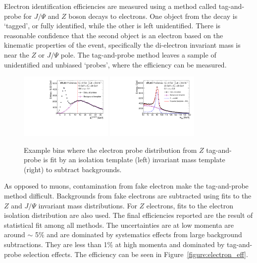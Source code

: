 Electron identification efficiencies are measured using a method called tag-and-probe for $J/\Psi$ and $Z$ boson decays to electrons. One object from the decay is `tagged', or fully identified, while the other is left unidentified. There is reasonable confidence that the second object is an electron based on the kinematic properties of the event, specifically the di-electron invariant mass is near the $Z$ or $J/\Psi$ pole. The tag-and-probe method leaves a sample of unidentified and unbiased `probes', where the efficiency can be measured.

\begin{figure}[!t]
\centering 
\includegraphics[width=0.40\textwidth]{figs/electron/fig_06a}
\includegraphics[width=0.40\textwidth]{figs/electron/fig_04a}
\caption{Example bins where the electron probe distribution from $Z$ tag-and-probe is fit by an isolation template (left) invariant mass template (right) to subtract backgrounds.} 
\label{figure:electron_probe}
\end{figure}


As opposed to muons, contamination from fake electron make the tag-and-probe method difficult. Backgrounds from fake electrons are subtracted using fits to the $Z$ and $J/\Psi$ invariant mass distributions. For $Z$ electrons, fits to the electron isolation distribution are also used. The final efficiencies reported are the result of statistical fit among all methods. The uncertainties are at low momenta are around $\sim$ 5\% and are dominated by systematics effects from large background subtractions. They are less than 1\% at high momenta and dominated by tag-and-probe selection effects. The efficiency can be seen in Figure~\ref{figure:electron_eff}. 

